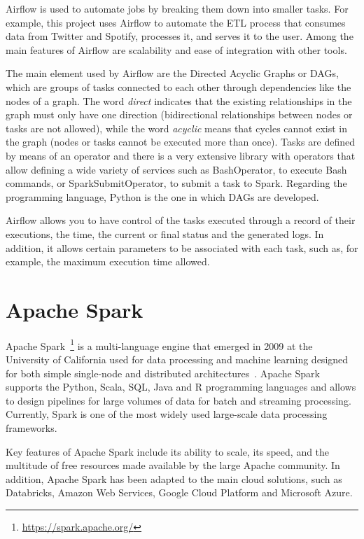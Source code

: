 \nonzeroparskip Airflow is used to automate jobs by breaking them down into smaller tasks. For example, this project uses Airflow to automate the ETL process that consumes data from Twitter and Spotify, processes it, and serves it to the user. Among the main features of Airflow are scalability and ease of integration with other tools.

\nonzeroparskip The main element used by Airflow are the Directed Acyclic Graphs or DAGs, which are groups of tasks connected to each other through dependencies like the nodes of a graph. The word \textit{direct} indicates that the existing relationships in the graph must only have one direction (bidirectional relationships between nodes or tasks are not allowed), while the word \textit{acyclic} means that cycles cannot exist in the graph (nodes or tasks cannot be executed more than once). Tasks are defined by means of an operator and there is a very extensive library with operators that allow defining a wide variety of services such as BashOperator, to execute Bash commands, or SparkSubmitOperator, to submit a task to Spark. Regarding the programming language, Python is the one in which DAGs are developed.

\nonzeroparskip Airflow allows you to have control of the tasks executed through a record of their executions, the time, the current or final status and the generated logs. In addition, it allows certain parameters to be associated with each task, such as, for example, the maximum execution time allowed.

\section{Apache Spark}

\nonzeroparskip Apache Spark~\footnote{\url{https://spark.apache.org/}} is a multi-language engine that emerged in 2009 at the University of California used for data processing and machine learning designed for both simple single-node and distributed architectures~\cite{infoworld_spark}. Apache Spark supports the Python, Scala, SQL, Java and R programming languages and allows to design pipelines for large volumes of data for batch and streaming processing. Currently, Spark is one of the most widely used large-scale data processing frameworks.

\nonzeroparskip Key features of Apache Spark include its ability to scale, its speed, and the multitude of free resources made available by the large Apache community. In addition, Apache Spark has been adapted to the main cloud solutions, such as Databricks, Amazon Web Services, Google Cloud Platform and Microsoft Azure.

